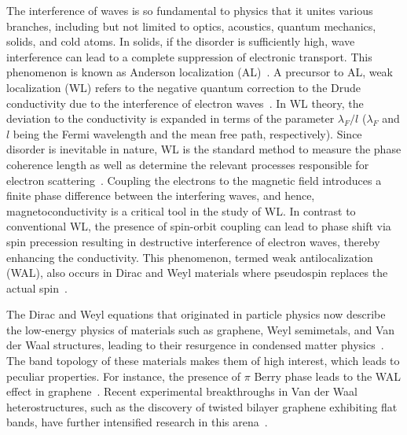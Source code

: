 \documentclass[aps,prb,amsmath,amssymb,footinbib,showpacs,twocolumn]{revtex4-2}
\begin{document}
\maketitle
The interference of waves is so fundamental to physics that it unites various branches, including but not limited to optics, acoustics, quantum mechanics, solids, and cold atoms. In solids, if the disorder is sufficiently high, wave interference can lead to a complete suppression of electronic transport. This phenomenon is known as Anderson localization (AL)~\cite{anderson1958absence}. A precursor to AL, weak localization (WL) refers to the negative quantum correction to the Drude conductivity due to the interference of electron waves~\cite{altshuler1980magnetoresistance,bergmann1984weak}. In WL theory, the deviation to the conductivity is expanded in terms of the parameter $\lambda_F/l$ ($\lambda_F$ and $l$ being the Fermi wavelength and the mean free path, respectively). Since disorder is inevitable in nature, WL is the standard method to measure the phase coherence length as well as determine the relevant processes responsible for electron scattering~\cite{chakravarty1986weak,beenakker1991quantum}. Coupling the electrons to the magnetic field introduces a finite phase difference between the interfering waves, and hence, magnetoconductivity is a critical tool in the study of WL. In contrast to conventional WL, the presence of spin-orbit coupling can lead to phase shift via spin precession resulting in destructive interference of electron waves, thereby enhancing the conductivity. This phenomenon, termed weak antilocalization~\cite{hikami1980spin} (WAL), also occurs in Dirac and Weyl materials where pseudospin replaces the actual spin~\cite{suzuura2002crossover,khveshchenko2006electron,mccann2006weak,gorbachev2007weak,wu2007weak,gorbachev2007weak,tikhonenko2008weak,tikhonenko2008weak,tkachov2011weak,lu2011competition,lu2013intervalley,lu2014finite,fu2019quantum}.

The Dirac and Weyl equations that originated in particle physics now describe the low-energy physics of materials such as graphene, Weyl semimetals, and Van der Waal structures, leading to their resurgence in condensed matter physics~\cite{neto2009electronic,sarma2011electronic,armitage2018weyl}. The band topology of these materials makes them of high interest, which leads to peculiar properties. For instance, the presence of $\pi$ Berry phase leads to the WAL effect in graphene~\cite{suzuura2002crossover,khveshchenko2006electron,mccann2006weak}. Recent experimental breakthroughs in Van der Waal heterostructures, such as the discovery of twisted bilayer graphene exhibiting flat bands, have further intensified research in this arena~\cite{cao2018unconventional}. 
\end{document}
